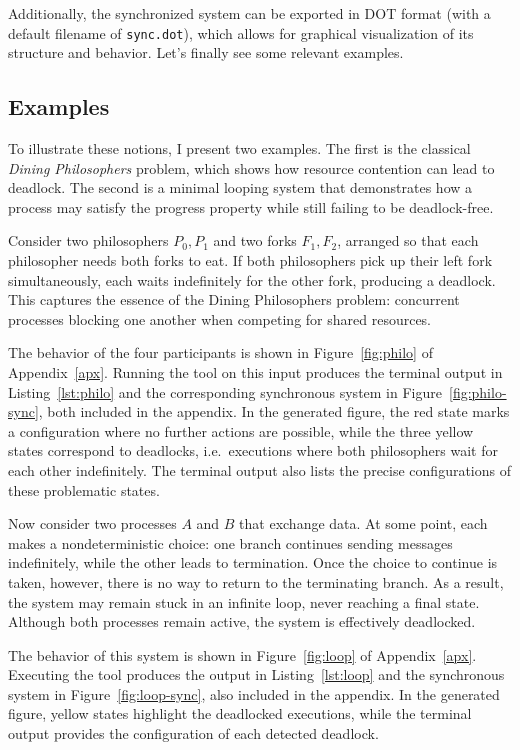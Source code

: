 Additionally, the synchronized system can be exported in DOT format
(with a default filename of \verb|sync.dot|), which allows for graphical 
visualization of its structure and behavior.
Let's finally see some relevant examples.


\subsection{Examples}

To illustrate these notions, I present two examples. The first is the
classical \emph{Dining Philosophers} problem, which shows how resource
contention can lead to deadlock. The second is a minimal looping system
that demonstrates how a process may satisfy the progress property while
still failing to be deadlock-free.

\begin{example}\label{exm:philo}
Consider two philosophers $P_0, P_1$ and two forks $F_1, F_2$, arranged
so that each philosopher needs both forks to eat. If both philosophers
pick up their left fork simultaneously, each waits indefinitely for the
other fork, producing a deadlock. This captures the essence of the Dining
Philosophers problem: concurrent processes blocking one another when
competing for shared resources.

The behavior of the four participants is shown in
Figure~\ref{fig:philo} of Appendix~\ref{apx}. Running the tool on
this input produces the terminal output in
Listing~\ref{lst:philo} and the corresponding synchronous system in
Figure~\ref{fig:philo-sync}, both included in the appendix. In the
generated figure, the red state marks a configuration where no further
actions are possible, while the three yellow states correspond to
deadlocks, i.e.\ executions where both philosophers wait for each other
indefinitely. The terminal output also lists the precise configurations
of these problematic states.
\end{example}

\begin{example}\label{exm:loop}
Now consider two processes $A$ and $B$ that exchange data. At some
point, each makes a nondeterministic choice: one branch continues
sending messages indefinitely, while the other leads to termination.
Once the choice to continue is taken, however, there is no way to
return to the terminating branch. As a result, the system may remain
stuck in an infinite loop, never reaching a final state. Although both
processes remain active, the system is effectively deadlocked.

The behavior of this system is shown in Figure~\ref{fig:loop} of
Appendix~\ref{apx}. Executing the tool produces the output in
Listing~\ref{lst:loop} and the synchronous system in
Figure~\ref{fig:loop-sync}, also included in the appendix. In the
generated figure, yellow states highlight the deadlocked executions,
while the terminal output provides the configuration of each detected
deadlock.
\end{example}
